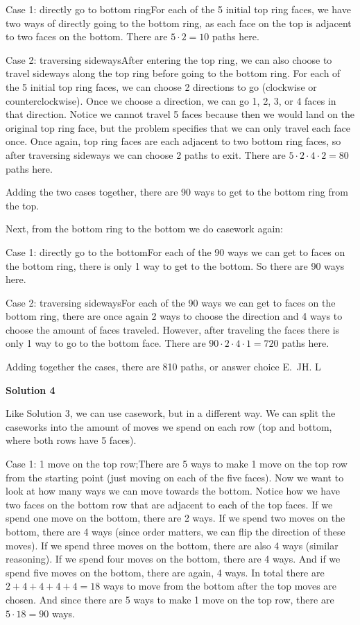 \begin{enumerate}
 Case 1: directly go to bottom ringFor each of the 5 initial top ring faces, we have two ways of directly going to the bottom ring, as each face on the top is adjacent to two faces on the bottom. There are $5 \cdot 2 = 10$ paths here.

 Case 2: traversing sidewaysAfter entering the top ring, we can also choose to travel sideways along the top ring before going to the bottom ring. For each of the 5 initial top ring faces, we can choose 2 directions to go (clockwise or counterclockwise). Once we choose a direction, we can go 1, 2, 3, or 4 faces in that direction. Notice we cannot travel 5 faces because then we would land on the original top ring face, but the problem specifies that we can only travel each face once. Once again, top ring faces are each adjacent to two bottom ring faces, so after traversing sideways we can choose 2 paths to exit. There are $5 \cdot 2 \cdot 4 \cdot 2 = 80$ paths here.

 Adding the two cases together, there are 90 ways to get to the bottom ring from the top.

 Next, from the bottom ring to the bottom we do casework again:

 Case 1: directly go to the bottomFor each of the 90 ways we can get to faces on the bottom ring, there is only 1 way to get to the bottom. So there are 90 ways here.

 Case 2: traversing sidewaysFor each of the 90 ways we can get to faces on the bottom ring, there are once again 2 ways to choose the direction and 4 ways to choose the amount of faces traveled. However, after traveling the faces there is only 1 way to go to the bottom face. There are $90 \cdot 2 \cdot 4 \cdot 1 = 720$ paths here.

 Adding together the cases, there are 810 paths, or answer choice E.~JH. L

 



\textbf{Solution 4}

Like Solution 3, we can use casework, but in a different way. We can split the caseworks into the amount of moves we spend on each row (top and bottom, where both rows have 5 faces).

 Case 1: 1 move on the top row;There are 5 ways to make 1 move on the top row from the starting point (just moving on each of the five faces). Now we want to look at how many ways we can move towards the bottom. Notice how we have two faces on the bottom row that are adjacent to each of the top faces. If we spend one move on the bottom, there are 2 ways. If we spend two moves on the bottom, there are 4 ways (since order matters, we can flip the direction of these moves). If we spend three moves on the bottom, there are also 4 ways (similar reasoning). If we spend four moves on the bottom, there are 4 ways. And if we spend five moves on the bottom, there are again, 4 ways. In total there are $2 + 4 + 4 + 4 + 4 = 18$ ways to move from the bottom after the top moves are chosen. And since there are 5 ways to make 1 move on the top row, there are $5 \cdot 18 = 90$ ways.


\end{enumerate}
